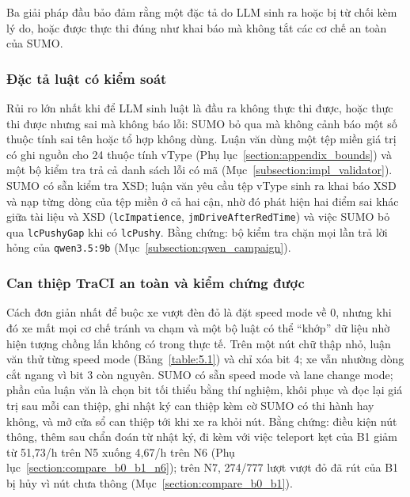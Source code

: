 \documentclass[../main.tex]{subfiles}
\begin{document}
Ba giải pháp đầu bảo đảm rằng một đặc tả do LLM sinh ra hoặc bị từ chối kèm lý do, hoặc được thực thi đúng như khai báo mà không tắt các cơ chế an toàn của SUMO.

\subsubsection{Đặc tả luật có kiểm soát}
\label{section:5.1}

Rủi ro lớn nhất khi để LLM sinh luật là đầu ra không thực thi được, hoặc thực thi được nhưng sai mà không báo lỗi: SUMO bỏ qua mà không cảnh báo một số thuộc tính sai tên hoặc tổ hợp không dùng. Luận văn dùng một tệp miền giá trị có ghi nguồn cho 24 thuộc tính vType (Phụ lục~\ref{section:appendix_bounds}) và một bộ kiểm tra trả cả danh sách lỗi có mã (Mục~\ref{subsection:impl_validator}). SUMO có sẵn kiểm tra XSD; luận văn yêu cầu tệp vType sinh ra khai báo XSD và nạp từng dòng của tệp miền ở cả hai cận, nhờ đó phát hiện hai điểm sai khác giữa tài liệu và XSD (\texttt{lcImpatience}, \texttt{jmDriveAfterRedTime}) và việc SUMO bỏ qua \texttt{lcPushyGap} khi có \texttt{lcPushy}. Bằng chứng: bộ kiểm tra chặn mọi lần trả lời hỏng của \texttt{qwen3.5:9b} (Mục~\ref{subsection:qwen_campaign}).

\subsubsection{Can thiệp TraCI an toàn và kiểm chứng được}
\label{section:5.2}

Cách đơn giản nhất để buộc xe vượt đèn đỏ là đặt speed mode về 0, nhưng khi đó xe mất mọi cơ chế tránh va chạm và một bộ luật có thể ``khớp'' dữ liệu nhờ hiện tượng chồng lấn không có trong thực tế. Trên một nút chữ thập nhỏ, luận văn thử từng speed mode (Bảng~\ref{table:5.1}) và chỉ xóa bit 4; xe vẫn nhường dòng cắt ngang vì bit 3 còn nguyên. SUMO có sẵn speed mode và lane change mode; phần của luận văn là chọn bit tối thiểu bằng thí nghiệm, khôi phục và đọc lại giá trị sau mỗi can thiệp, ghi nhật ký can thiệp kèm cờ SUMO có thi hành hay không, và mở cửa sổ can thiệp tới khi xe ra khỏi nút. Bằng chứng: điều kiện nút thông, thêm sau chẩn đoán từ nhật ký, đi kèm với việc teleport kẹt của B1 giảm từ 51,73/h trên N5 xuống 4,67/h trên N6 (Phụ lục~\ref{section:compare_b0_b1_n6}); trên N7, 274/777 lượt vượt đỏ đã rút của B1 bị hủy vì nút chưa thông (Mục~\ref{section:compare_b0_b1}).
\end{document}

